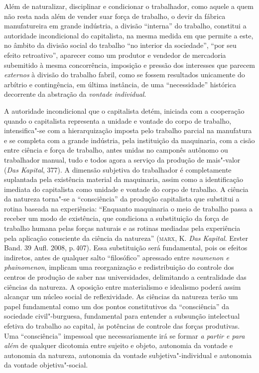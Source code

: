 Além de naturalizar, disciplinar e condicionar o trabalhador, como
aquele a quem não resta nada além de vender suar força de trabalho, o
devir da fábrica manufatureira em grande indústria, a divisão
``interna'' do trabalho, constitui a autoridade incondicional do
capitalista, na mesma medida em que permite a este, no âmbito da divisão
social do trabalho ``no interior da sociedade'', ``por seu efeito
retroativo'', aparecer como um produtor e vendedor de mercadoria
subemitido à mesma concorrência, imposição e pressão dos interesses que
parecem \emph{externos} à divisão do trabalho fabril, como se fossem
resultados unicamente do arbítrio e contingência, em última instância,
de uma ``necessidade'' histórica decorrente da abstração da
\emph{vontade} \emph{individual}.

A autoridade incondicional que o capitalista detém, iniciada com a
cooperação quando o capitalista representa a unidade e vontade do corpo
de trabalho, intensifica"-se com a hierarquização imposta pelo trabalho
parcial na manufatura e se completa com a grande indústria, pela
instituição da maquinaria, com a cisão entre ciência e força de
trabalho, antes unidas no camponês autônomo ou trabalhador manual, tudo
e todos agora a serviço da produção de mais"-valor (\emph{Das Kapital},
377). A dimensão subjetiva do trabalhador é completamente suplantada
pela existência material da maquinaria, assim como a identificação
imediata do capitalista como unidade e vontade do corpo de trabalho. A
ciência da natureza torna"-se a ``consciência'' da produção capitalista
que substitui a rotina baseada na experiência: ``Enquanto maquinaria o
meio de trabalho passa a receber um modo de existência, que condiciona a
substituição da força de trabalho humana pelas forças naturais e as
rotinas mediadas pela experiência pela aplicação consciente da ciência
da natureza'' (\textsc{marx}, K. \emph{Das Kapital}. Erster Band. 39 Aufl. 2008,
p.\,407). Essa substituição será fundamental, pois os efeitos indiretos,
antes de qualquer salto ``filosófico'' apressado entre \emph{noumenon e
phainomenon}, implicam uma reorganização e redistribuição do controle
dos centros de produção de saber nas universidades, delimitando a
centralidade das ciências da natureza. A oposição entre materialismo e
idealismo poderá assim alcançar um núcleo social de reflexividade. As
ciências da natureza terão um papel fundamental como um dos pontos
constitutivos da ``consciência'' da sociedade civil"-burguesa,
fundamental para entender a subsunção intelectual efetiva do trabalho ao
capital, às potências de controle das forças produtivas. Uma
``consciência'' impessoal que necessariamente irá se formar \emph{a
partir e para além} de qualquer dicotomia entre sujeito e objeto,
autonomia da vontade e autonomia da natureza, autonomia da vontade
subjetiva"-individual e autonomia da vontade objetiva"-social.

